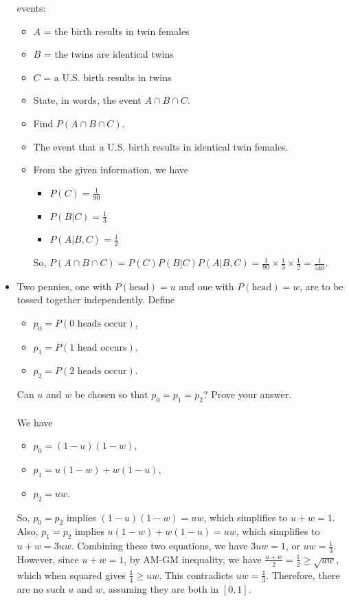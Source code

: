 \documentclass[12pt]{article}
\newenvironment{problem}[2][Problem]{\begin{trivlist}
\item[\hskip \labelsep {\bfseries #1}\hskip \labelsep {\bfseries #2.}]}
{\end{trivlist}}
\begin{document}
\begin{problem}{1}
\begin{itemize}
    events:
      \begin{itemize}
        \item $A$ = {the birth results in twin females}
        \item $B$ = {the twins are identical twins}
        \item $C$ = {a U.S. birth results in twins}
      \end{itemize}
      \begin{itemize}
        \item[(a)] State, in words, the event $A \cap B \cap C$.
        \item[(b)] Find $P(A \cap B \cap C)$.
      \end{itemize}
      \begin{itemize}
        \item[(a)] The event that a U.S. birth results in identical
        twin females.
        \item[(b)] From the given information, we have
        \begin{itemize}
          \item $P(C) = \frac{1}{90}$
          \item $P(B|C) = \frac{1}{3}$
          \item $P(A|B,C) = \frac{1}{2}$
        \end{itemize}
        So, $P(A \cap B \cap C) = P(C)P(B|C)P(A|B,C) = \frac{1}{90} \times
        \frac{1}{3} \times \frac{1}{2} = \frac{1}{540}$.
      \end{itemize} 
    \item[6] Two pennies, one with $P(\text{head}) = u$ and one with
    $P(\text{head}) = w$, are to be tossed together independently. Define
    \begin{itemize}
      \item $p_0 = P(\text{0 heads occur})$,
      \item $p_1 = P(\text{1 head occurs})$,
      \item $p_2 = P(\text{2 heads occur})$.
    \end{itemize}
    Can $u$ and $w$ be chosen so that $p_0 = p_1 = p_2$? Prove your answer.
    \\\\
    We have
    \begin{itemize}
      \item $p_0 = (1-u)(1-w)$,
      \item $p_1 = u(1-w) + w(1-u)$,
      \item $p_2 = uw$.
    \end{itemize}
    So, $p_0 = p_2$ implies $(1-u)(1-w) = uw$, which simplifies to
    $u + w = 1$. Also, $p_1 = p_2$ implies $u(1-w) + w(1-u) = uw$, which
    simplifies to $ u + w = 3uw$. Combining these two equations, we have
    $3uw = 1$, or $uw = \frac{1}{3}$. However, since $u + w = 1$, by AM-GM
    inequality, we have $\frac{u+w}{2} = \frac{1}{2} \ge \sqrt{uw}$, which
    when squared gives $\frac{1}{4} \ge uw$. This
    contradicts $uw = \frac{1}{3}$. Therefore, there are no such $u$ and $w$,
    assuming they are both in $[0,1]$.
  \end{itemize}
\end{problem}
\end{document}
